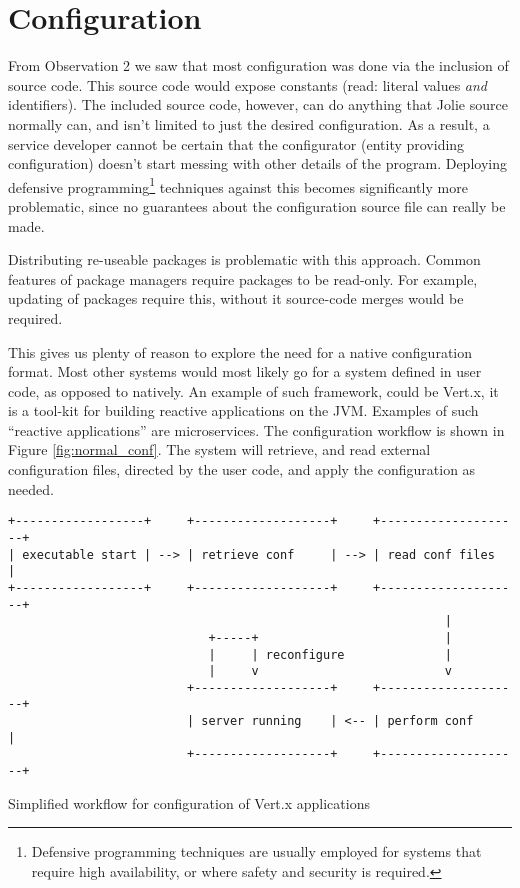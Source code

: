 \section{Configuration}
\label{sec:col}


From Observation 2 we saw that most configuration was done via the inclusion of
source code. This source code would expose constants (read: literal values
\emph{and} identifiers). The included source code, however, can do anything
that Jolie source normally can, and isn't limited to just the desired
configuration. As a result, a service developer cannot be certain that the
configurator (entity providing configuration) doesn't start messing with
other details of the program. Deploying defensive
programming\footnote{Defensive programming techniques are usually employed for
systems that require high availability, or where safety and security is
required.} techniques against this becomes significantly more problematic,
since no guarantees about the configuration source file can really be made.

Distributing re-useable packages is problematic with this approach. Common
features of package managers require packages to be read-only. For example,
updating of packages require this, without it source-code merges would
be required.

This gives us plenty of reason to explore the need for a native configuration
format.  Most other systems would most likely go for a system defined in user
code, as opposed to natively. An example of such framework, could be Vert.x, it
is a tool-kit for building reactive applications on the JVM.  Examples of such
``reactive applications'' are microservices. The configuration workflow is
shown in Figure \ref{fig:normal_conf}. The system will retrieve, and read
external configuration files, directed by the user code, and apply the
configuration as needed.


\begin{listing}[H]
\begin{verbatim}
+------------------+     +-------------------+     +--------------------+
| executable start | --> | retrieve conf     | --> | read conf files    |
+------------------+     +-------------------+     +--------------------+
                                                             |
                            +-----+                          |
                            |     | reconfigure              |
                            |     v                          v
                         +-------------------+     +--------------------+
                         | server running    | <-- | perform conf       |
                         +-------------------+     +--------------------+
\end{verbatim}
\caption{Simplified workflow for configuration of Vert.x applications}
\label{fig:normal_conf}
\end{listing}

